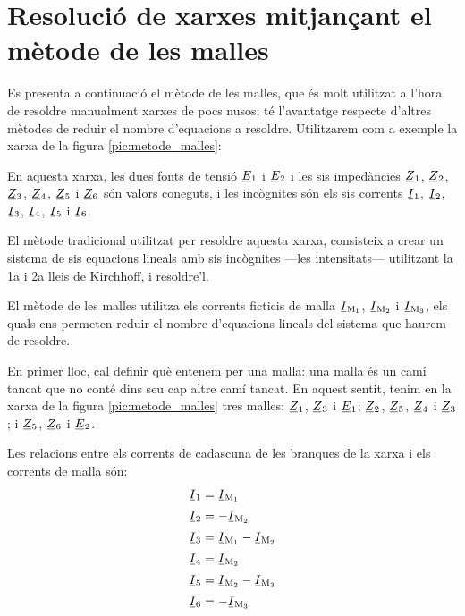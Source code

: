 \section{Resolució de xarxes mitjançant el mètode de les malles}\label{sec:metode-malles}


Es presenta a continuació el mètode de les malles, que és molt utilitzat a l'hora de resoldre manualment xarxes de pocs nusos; té l'avantatge respecte d'altres mètodes de reduir el nombre d'equacions a resoldre. Utilitzarem com a exemple la xarxa de la figura \vref{pic:metode_malles}:

\begin{center}
    
     \label{pic:metode_malles}
\end{center}

En aquesta xarxa, les dues fonts de tensió $\cmplx{E}_1$ i $\cmplx{E}_2$ i les sis impedàncies $\cmplx{Z}_1$, $\cmplx{Z}_2$, $\cmplx{Z}_3$, $\cmplx{Z}_4$, $\cmplx{Z}_5$ i $\cmplx{Z}_6$  són valors coneguts, i les incògnites són els sis corrents $\cmplx{I}_1$, $\cmplx{I}_2$, $\cmplx{I}_3$, $\cmplx{I}_4$, $\cmplx{I}_5$ i $\cmplx{I}_6$.

El mètode tradicional utilitzat per  resoldre aquesta xarxa, consisteix a crear un sistema  de sis equacions lineals amb sis incògnites ---les intensitats--- utilitzant  la 1a i 2a lleis de Kirchhoff, i resoldre'l.

El mètode de les malles utilitza els corrents ficticis de malla $\cmplx{I}\ped{M_1}$, $\cmplx{I}\ped{M_2}$ i $\cmplx{I}\ped{M_3}$, els quals ens permeten reduir el nombre d'equacions lineals del  sistema que haurem de resoldre.



En primer lloc, cal definir què entenem per una malla: una malla és un camí tancat que no conté dins seu cap altre camí tancat. En aquest sentit, tenim en la xarxa de la figura \vref{pic:metode_malles} tres malles: $\cmplx{Z}_1$, $\cmplx{Z}_3$ i $\cmplx{E}_1$; $\cmplx{Z}_2$, $\cmplx{Z}_5$, $\cmplx{Z}_4$ i $\cmplx{Z}_3$; i $\cmplx{Z}_5$, $\cmplx{Z}_6$ i $\cmplx{E}_2$.

Les relacions entre els corrents de cadascuna de les branques de la xarxa i els corrents de malla són:
\begin{subequations}
\begin{align}
    \cmplx{I}_1 &= \cmplx{I}\ped{M_1} \label{eq:malles1} \\[0.5ex]
    \cmplx{I}_2 &= -\cmplx{I}\ped{M_2} \\[0.5ex]
    \cmplx{I}_3 &= \cmplx{I}\ped{M_1}-\cmplx{I}\ped{M_2} \\[0.5ex]
    \cmplx{I}_4 &= \cmplx{I}\ped{M_2} \\[0.5ex]
    \cmplx{I}_5 &= \cmplx{I}\ped{M_2}-\cmplx{I}\ped{M_3} \\[0.5ex]
    \cmplx{I}_6 &= -\cmplx{I}\ped{M_3} \label{eq:malles2}
\end{align}
\end{subequations}


